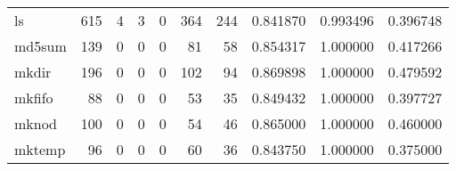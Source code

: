 \begin{tabular}{lrrrrrrrrr}
ls        &                                   615 &                                                  4 &                                                  3 &                                                  0 &                                                364 &                                                244 &                                           0.841870 &                               0.993496 &                             0.396748 \\
md5sum    &                                   139 &                                                  0 &                                                  0 &                                                  0 &                                                 81 &                                                 58 &                                           0.854317 &                               1.000000 &                             0.417266 \\
mkdir     &                                   196 &                                                  0 &                                                  0 &                                                  0 &                                                102 &                                                 94 &                                           0.869898 &                               1.000000 &                             0.479592 \\
mkfifo    &                                    88 &                                                  0 &                                                  0 &                                                  0 &                                                 53 &                                                 35 &                                           0.849432 &                               1.000000 &                             0.397727 \\
mknod     &                                   100 &                                                  0 &                                                  0 &                                                  0 &                                                 54 &                                                 46 &                                           0.865000 &                               1.000000 &                             0.460000 \\
mktemp    &                                    96 &                                                  0 &                                                  0 &                                                  0 &                                                 60 &                                                 36 &                                           0.843750 &                               1.000000 &                             0.375000 \\

\end{tabular}
